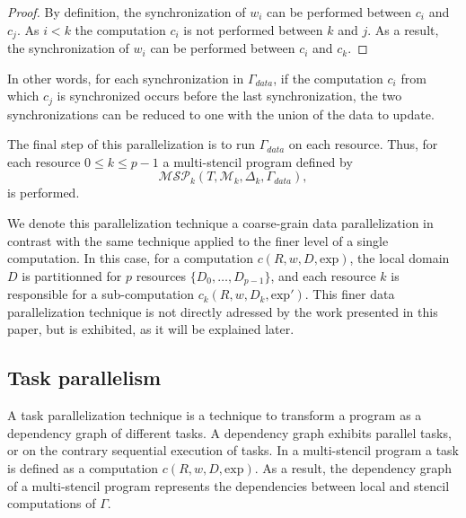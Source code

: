 \begin{proof}
By definition, the synchronization of $w_i$ can be performed between $c_i$ and $c_j$. As $i<k$ the computation $c_i$ is not performed between $k$ and $j$. As a result, the synchronization of $w_i$ can be performed between $c_i$ and $c_k$.
\end{proof}

In other words, for each synchronization in $\Gamma_{data}$, if the computation $c_i$ from which $c_j$ is synchronized occurs before the last synchronization, the two synchronizations can be reduced to one with the union of the data to update.


 The final step of this parallelization is to run $\Gamma_{data}$ on each resource. Thus, for each resource $0 \leq k \leq p-1$ a multi-stencil program defined by
\begin{equation}
\mathcal{MSP}_k(T,\mathcal{M}_k,\Delta_k,\Gamma_{data}),
\end{equation}
is performed.

We denote this parallelization technique a coarse-grain data parallelization in contrast with the same technique applied to the finer level of a single computation. In this case, for a computation $c(R,w,D,\text{exp})$, the local domain $D$ is partitionned for $p$ resources $\{D_0,\dots,D_{p-1}\}$, and each resource $k$ is responsible for a sub-computation $c_k(R,w,D_k,\text{exp}')$.
This finer data parallelization technique is not directly adressed by the work presented in this paper, but is exhibited, as it will be explained later. 

\subsection{Task parallelism}
A task parallelization technique is a technique to transform a program as a dependency graph of different tasks. A dependency graph exhibits parallel tasks, or on the contrary sequential execution of tasks. In a multi-stencil program a task is defined as a computation $c(R,w,D,\text{exp})$. As a result, the dependency graph of a multi-stencil program represents the dependencies between local and stencil computations of $\Gamma$.

